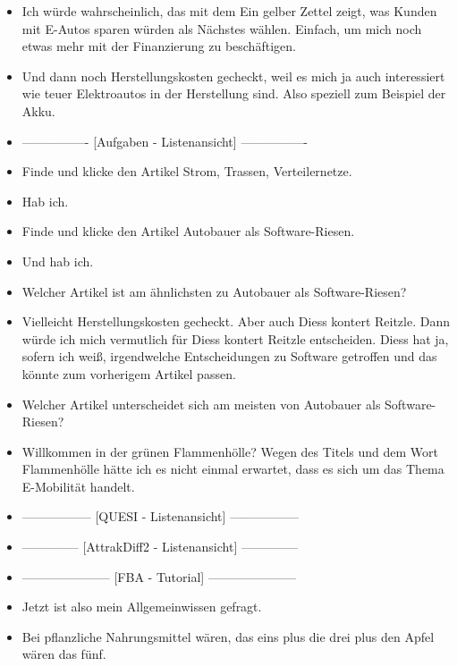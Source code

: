 {\begin{itemize}[]
        \item {} Ich würde wahrscheinlich, das mit dem \flqq Ein gelber Zettel zeigt, was Kunden mit E-Autos sparen würden\frqq{} als Nächstes wählen.
              Einfach, um mich noch etwas mehr mit der Finanzierung zu beschäftigen.
        \item {} Und dann noch \flqq Herstellungskosten\frqq{} gecheckt, weil es mich ja auch interessiert wie teuer Elektroautos in der Herstellung sind.
              Also speziell zum Beispiel der Akku.
        \item {----------------} [Aufgaben - Listenansicht] {----------------}
        \item {} Finde und klicke den Artikel \flqq Strom, Trassen, Verteilernetze\frqq{}.
        \item {} Hab ich.
        \item {} Finde und klicke den Artikel \flqq Autobauer als Software-Riesen\frqq{}.
        \item {} Und hab ich.
        \item {} Welcher Artikel ist am ähnlichsten zu \flqq Autobauer als Software-Riesen\frqq{}?
        \item {} Vielleicht \flqq Herstellungskosten gecheckt\frqq{}.
              Aber auch \flqq Diess kontert Reitzle\frqq{}.
              Dann würde ich mich vermutlich für \flqq Diess kontert Reitzle\frqq{} entscheiden.
              Diess hat ja, sofern ich weiß, irgendwelche Entscheidungen zu Software getroffen und das könnte zum vorherigem Artikel passen.
        \item {} Welcher Artikel unterscheidet sich am meisten von \flqq Autobauer als Software-Riesen\frqq{}?
        \item {} \flqq Willkommen in der grünen Flammenhölle\frqq{}?
              Wegen des Titels und dem Wort Flammenhölle hätte ich es nicht einmal erwartet, dass es sich um das Thema E-Mobilität handelt.
        \item {-----------------} [QUESI - Listenansicht] {-----------------}
        \item {--------------} [AttrakDiff2 - Listenansicht] {--------------}
        \item {---------------------} [FBA - Tutorial] {---------------------}
        \item {} Jetzt ist also mein Allgemeinwissen gefragt.
        \item {} Bei pflanzliche Nahrungsmittel wären, das eins plus die drei plus den Apfel wären das fünf.

\end{itemize}}
